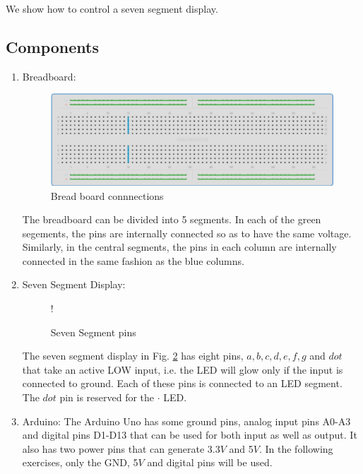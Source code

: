 We show how to control
a seven segment display.
\subsection{Components}
\begin{enumerate}[label=\arabic*.,ref=\theenumi]
\begin{table}[H]
	\centering

\caption{Components}
\label{table:components}
\end{table}
%
\item Breadboard:
\begin{figure}[H]
\begin{center}
\includegraphics[width=0.75\columnwidth]{ide/sevenseg/figs/breadboard}
\end{center}
\caption{Bread board connnections}
\label{fig:breadboard}
\end{figure}
%
The breadboard can be divided into 5 segments.  In each of the green segements, the pins are internally connected so as to have the same voltage.  Similarly, in the central segments, the pins in each column  are internally connected in the same fashion as the blue columns. 
\item Seven Segment Display:
\begin{figure}[!htb]
\begin{center}
 {!} {

}
\end{center}
\caption{Seven Segment pins}
\label{fig:sevenseg}
\end{figure}
%
The seven segment display in Fig. \ref{fig:sevenseg} has eight pins, $a, b, c, d, e, f, g$ and $dot$ that take an active LOW input, i.e.  the LED will glow only if the input is connected to ground.  Each of these pins is connected to an LED segment.  The $dot$ pin is  reserved for the $\cdot$ LED.  
%
\item Arduino:
The Arduino Uno has some ground pins, analog input pins A0-A3 and digital pins D1-D13 that can be used for both input as well as output. It also has two power pins that can generate 3.3$V$ and 5$V$.  In the following exercises, only the GND, 5$V$ and digital pins will be used.
\end{enumerate}
%
